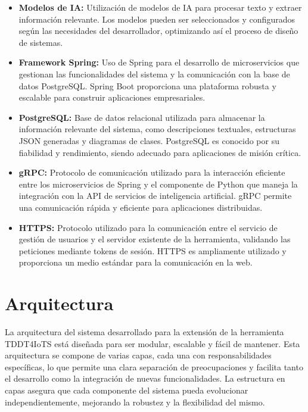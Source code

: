 \begin{itemize}
	\item \textbf{Modelos de IA:}
	Utilización de modelos de IA para procesar texto y extraer información relevante. Los modelos pueden ser seleccionados y configurados según las necesidades del desarrollador, optimizando así el proceso de diseño de sistemas.
	
	\item \textbf{Framework Spring:}
	Uso de Spring para el desarrollo de microservicios que gestionan las funcionalidades del sistema y la comunicación con la base de datos PostgreSQL. Spring Boot proporciona una plataforma robusta y escalable para construir aplicaciones empresariales.
	
	\item \textbf{PostgreSQL:}
	Base de datos relacional utilizada para almacenar la información relevante del sistema, como descripciones textuales, estructuras JSON generadas y diagramas de clases. PostgreSQL es conocido por su fiabilidad y rendimiento, siendo adecuado para aplicaciones de misión crítica.
	
	\item \textbf{gRPC:}
	Protocolo de comunicación utilizado para la interacción eficiente entre los microservicios de Spring y el componente de Python que maneja la integración con la API de servicios de inteligencia artificial. gRPC permite una comunicación rápida y eficiente para aplicaciones distribuidas.
	
	\item \textbf{HTTPS:}
	Protocolo utilizado para la comunicación entre el servicio de gestión de usuarios y el servidor existente de la herramienta, validando las peticiones mediante tokens de sesión. HTTPS es ampliamente utilizado y proporciona un medio estándar para la comunicación en la web.
\end{itemize}

\section{Arquitectura}

La arquitectura del sistema desarrollado para la extensión de la herramienta TDDT4IoTS está diseñada para ser modular, escalable y fácil de mantener. Esta arquitectura se compone de varias capas, cada una con responsabilidades específicas, lo que permite una clara separación de preocupaciones y facilita tanto el desarrollo como la integración de nuevas funcionalidades. La estructura en capas asegura que cada componente del sistema pueda evolucionar independientemente, mejorando la robustez y la flexibilidad del mismo.

